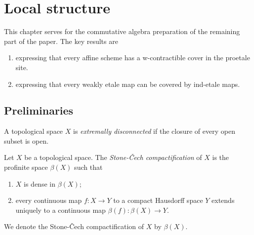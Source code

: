 \chapter{Local structure}

This chapter serves for the commutative algebra preparation of the remaining part of the paper. The key results are
\begin{enumerate}
  \item {} expressing that every affine scheme has a w-contractible cover in the proetale site.
  \item {} expressing that every weakly etale map can be covered by ind-etale maps.
\end{enumerate}

\section{Preliminaries}

\begin{definition}
  \label{def:extremally-disconnected}
  \mathlibok

  A topological space \(X\) is \emph{extremally disconnected} if the closure of every open subset is open.
\end{definition}

\begin{definition} 
  \label{def:stone-cech-compactification}
  \mathlibok

  Let \(X\) be a topological space. The \emph{Stone-Čech compactification} of \(X\) is the
  profinite space \(\beta(X)\) such that
  \begin{enumerate}
    \item \(X\) is dense in \(\beta(X)\);
    \item every continuous map \(f: X \to Y\) to a compact Hausdorff space \(Y\)
        extends uniquely to a continuous map \(\beta(f): \beta(X) \to Y\).
  \end{enumerate}
  We denote the Stone-Čech compactification of \(X\) by \(\beta(X)\).
\end{definition}


